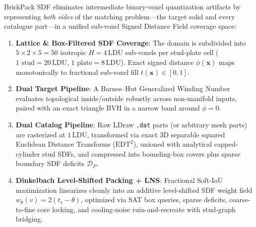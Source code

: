 \documentclass[11pt,twoside]{article}
\newcommand{\ldu}{\,\text{LDU}}
\newcommand{\code}[1]{\texttt{#1}}
\begin{document}
BrickPack SDF eliminates intermediate binary-voxel quantization artifacts by representing \emph{both sides} of the matching problem—the target solid and every catalogue part—in a unified sub-voxel Signed Distance Field coverage space:
\begin{enumerate}[leftmargin=*,nosep]
  \item \textbf{Lattice \& Box-Filtered SDF Coverage}: The domain is subdivided into $5\times 2\times 5 = 50$ isotropic $H = 4\ldu$ sub-voxels per stud-plate cell ($1\text{ stud} = 20\ldu$, $1\text{ plate} = 8\ldu$). Exact signed distance $\phi(\mathbf{x})$ maps monotonically to fractional sub-voxel fill $t(\mathbf{x}) \in [0,1]$.
  \item \textbf{Dual Target Pipeline}: A Barnes--Hut Generalized Winding Number evaluates topological inside/outside robustly across non-manifold inputs, paired with an exact triangle BVH in a narrow band around $\phi=0$.
  \item \textbf{Dual Catalog Pipeline}: Raw LDraw \code{.dat} parts (or arbitrary mesh parts) are rasterized at $1\ldu$, transformed via exact 3D separable squared Euclidean Distance Transforms ($\mathrm{EDT}^2$), unioned with analytical capped-cylinder stud SDFs, and compressed into bounding-box covers plus sparse boundary SDF deficits $\mathcal{D}_P$.
  \item \textbf{Dinkelbach Level-Shifted Packing + LNS}: Fractional Soft-IoU maximization linearizes cleanly into an additive level-shifted SDF weight field $w_\theta(v) = 2(t_v - \theta)$, optimized via SAT box queries, sparse deficits, coarse-to-fine core locking, and cooling-noise ruin-and-recreate with stud-graph bridging.
\end{enumerate}
\end{document}
